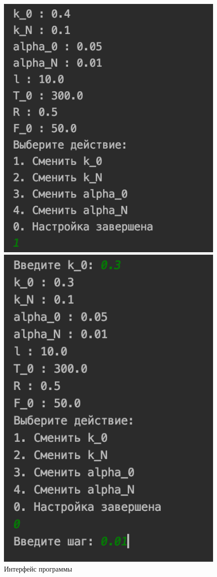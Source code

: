 \documentclass[a4paper,12pt]{article}
\begin{document}
	\begin{figure}[h!]
		\begin{center}
			\begin{minipage}[h!]{0.5\linewidth}
				\includegraphics[width=0.9\linewidth]{interf1.png}
			\end{minipage}
			\begin{minipage}[h!]{0.49\linewidth}
				\includegraphics[width=0.75\linewidth]{interf2.png}
			\end{minipage}
		\end{center}
		\caption{Интерфейс программы}
		\label{interf}
	\end{figure}

	
\end{document}
